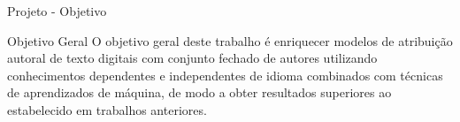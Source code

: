 	\begin{frame}{Projeto - Objetivo}
	\begin{block}{Objetivo Geral}
		O objetivo geral deste trabalho é enriquecer modelos de atribuição autoral de texto digitais com conjunto fechado de autores utilizando conhecimentos dependentes e independentes de idioma combinados com técnicas de aprendizados de máquina, de modo a obter resultados superiores ao estabelecido em trabalhos anteriores.
	\end{block}
\end{frame}